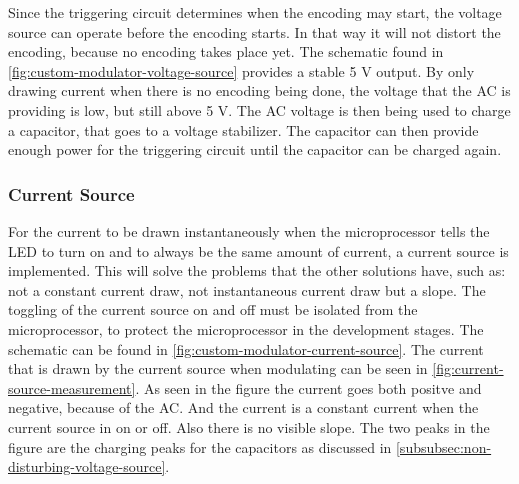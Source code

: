 	Since the triggering circuit determines when the encoding may start, the voltage source can operate before the encoding starts.
	In that way it will not distort the encoding, because no encoding takes place yet.
	The schematic found in \autoref{fig:custom-modulator-voltage-source} provides a stable 5 V output.
	By only drawing current when there is no encoding being done, the voltage that the AC is providing is low, but still above 5 V.
	The AC voltage is then being used to charge a capacitor, that goes to a voltage stabilizer.
	The capacitor can then provide enough power for the triggering circuit until the capacitor can be charged again.





	\subsubsection{Current Source}


	For the current to be drawn instantaneously when the microprocessor tells the LED to turn on and to always be the same amount of current, a current source is implemented. 
	This will solve the problems that the other solutions have, such as: not a constant current draw, not instantaneous current draw but a slope.
	The toggling of the current source on and off must be isolated from the microprocessor, to protect the microprocessor in the development stages.
	The schematic can be found in \autoref{fig:custom-modulator-current-source}.
	The current that is drawn by the current source when modulating can be seen in \autoref{fig:current-source-measurement}.
	As seen in the figure the current goes both positve and negative, because of the AC.
	And the current is a constant current when the current source in on or off.
	Also there is no visible slope.
	The two peaks in the figure are the charging peaks for the capacitors as discussed in \autoref{subsubsec:non-disturbing-voltage-source}.



